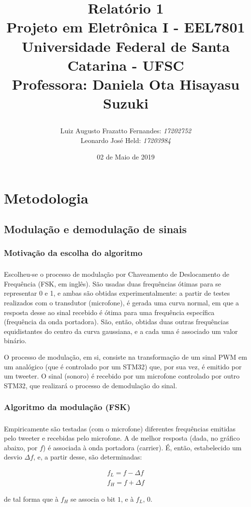 \documentclass[11pt,a4paper]{report}
\title{Relatório 1  \\
	Projeto em Eletrônica I - EEL7801 \\ \vfill
	\normalsize{Universidade Federal de Santa Catarina - UFSC \\
		Professora: Daniela Ota Hisayasu Suzuki}
	\author{
		{Luiz Augusto Frazatto Fernandes: \it{17202752}} \\
		{Leonardo José Held: \it{17203984}}
	}
}
\date{02 de Maio de 2019}
\begin{document}
	\maketitle
	\setcounter{chapter}{0}
	\chapter{Metodologia}
	\section{Modulação e demodulação de sinais}
	\subsection{Motivação da escolha do algoritmo}
	\paragraph{}
	\paragraph{}
	Escolheu-se o processo de modulação por Chaveamento de Deslocamento de Frequência (FSK, em inglês). São usadas duas frequências ótimas para se representar 0 e 1, e ambas são obtidas experimentalmente: a partir de testes realizados com o transdutor (microfone), é gerada uma curva normal, em que a resposta desse ao sinal recebido é ótima para uma frequência específica (frequência da onda portadora). São, então, obtidas duas outras frequências equidistantes do centro da curva gaussiana, e a cada uma é associado um valor binário.
	
	
	O processo de modulação, em si, consiste na transformação de um sinal PWM em um analógico (que é controlado por um STM32) que, por sua vez, é emitido por um tweeter. O sinal (sonoro) é recebido por um microfone controlado por outro STM32, que realizará o processo de demodulação do sinal.
	\subsection{Algoritmo da modulação (FSK)}	
	\paragraph{}
	Empiricamente são testadas (com o microfone) diferentes frequências emitidas pelo tweeter e recebidas pelo microfone. A de melhor resposta (dada, no gráfico abaixo, por $f$) é associada à onda portadora (carrier). É, então, estabelecido um desvio $\Delta{f}$, e, a partir desse, são determinadas:
	\begin{center}
		\begin{align*}
		f_L = f - \Delta{f}\\
		f_H = f + \Delta{f}
		\end{align*}
	\end{center}
	de tal forma que à $f_H$ se associa o bit $1$, e à $f_L$, $0$.
	
\end{document}

